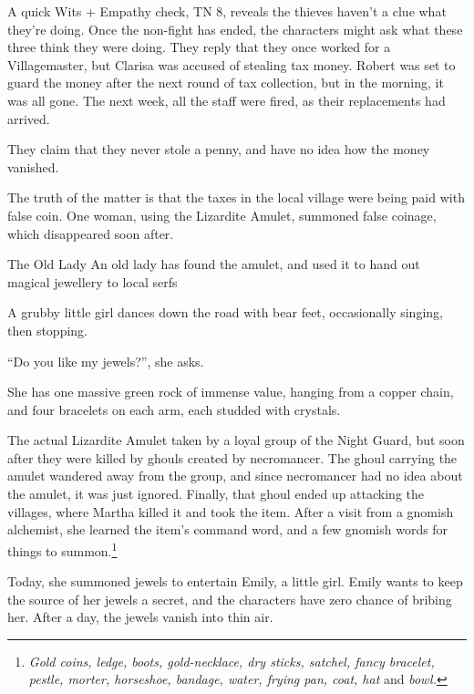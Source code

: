 \begin{multicols}{2}
A quick Wits + Empathy check, TN 8, reveals the thieves haven't a clue what they're doing.
Once the non-fight has ended, the characters might ask what these three think they were doing.
They reply that they once worked for a Villagemaster, but Clarisa was accused of stealing tax money.
Robert was set to guard the money after the next round of tax collection, but in the morning, it was all gone.
The next week, all the staff were fired, as their replacements had arrived.

They claim that they never stole a penny, and have no idea how the money vanished.

The truth of the matter is that the taxes in the local village were being paid with false coin.
One woman, using the Lizardite Amulet, summoned false coinage, which disappeared soon after.



{The Old Lady}%
{An old lady has found the amulet, and used it to hand out magical jewellery to local serfs}%

\begin{boxtext}
	A grubby little girl dances down the road with bear feet, occasionally singing, then stopping.

		``Do you like my jewels?'', she asks.

	She has one massive green rock of immense value, hanging from a copper chain, and four bracelets on each arm, each studded with crystals.
\end{boxtext}

The actual Lizardite Amulet taken by a loyal group of the Night Guard, but soon after they were killed by ghouls created by \gls{necromancer}.
The ghoul carrying the amulet wandered away from the group, and since \gls{necromancer} had no idea about the amulet, it was just ignored.
Finally, that ghoul ended up attacking the villages, where Martha killed it and took the item.
After a visit from a gnomish alchemist, she learned the item's command word, and a few gnomish words for things to summon.\footnote
{\textit{Gold coins, ledge, boots, gold-necklace, dry sticks, satchel, fancy bracelet, pestle, morter, horseshoe, bandage, water, frying pan, coat, hat} and \textit{bowl.}}

Today, she summoned jewels to entertain Emily, a little girl.
Emily wants to keep the source of her jewels a secret, and the characters have zero chance of bribing her.
After a day, the jewels vanish into thin air.


\end{multicols}
